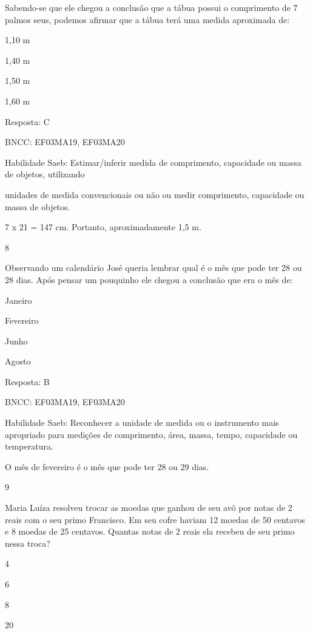 \begin{escolha}
\begin{escolha}
Sabendo-se que ele chegou a conclusão que a tábua possui o comprimento
de 7 palmos seus, podemos afirmar que a tábua terá uma medida aproximada
de:

\begin{escolha}
\item
  1,10 m
\item
  1,40 m
\item
  1,50 m
\item
  1,60 m
\end{escolha}

Resposta: C

BNCC: EF03MA19, EF03MA20

Habilidade Saeb: Estimar/inferir medida de comprimento, capacidade ou
massa de objetos, utilizando

unidades de medida convencionais ou não ou medir comprimento, capacidade
ou massa de objetos.

7 x 21 = 147 cm. Portanto, aproximadamente 1,5 m.

\num{8}

Observando um calendário José queria lembrar qual é o mês que pode ter
28 ou 28 dias. Após pensar um pouquinho ele chegou a conclusão que era o
mês de:

\begin{escolha}
\item
  Janeiro
\item
  Fevereiro
\item
  Junho
\item
  Agosto
\end{escolha}

Resposta: B

BNCC: EF03MA19, EF03MA20

Habilidade Saeb: Reconhecer a unidade de medida ou o instrumento mais
apropriado para medições de comprimento, área, massa, tempo, capacidade
ou temperatura.

O mês de fevereiro é o mês que pode ter 28 ou 29 dias.

\num{9}

Maria Luíza resolveu trocar as moedas que ganhou de seu avô por notas de
2 reais com o seu primo Francisco. Em seu cofre haviam 12 moedas de 50
centavos e 8 moedas de 25 centavos. Quantas notas de 2 reais ela recebeu
de seu primo nessa troca?

\begin{escolha}
\item
  4
\item
  6
\item
  8
\item
  20
\end{escolha}


\end{escolha}
\end{escolha}
